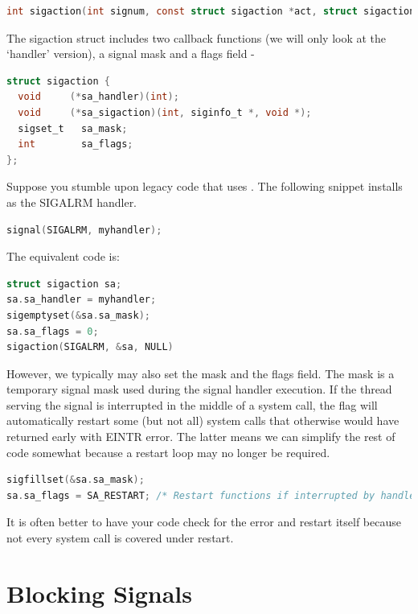 \begin{lstlisting}[language=C]
int sigaction(int signum, const struct sigaction *act, struct sigaction *oldact);
\end{lstlisting}

The sigaction struct includes two callback functions (we will only look at the `handler' version), a signal mask and a flags field -

\begin{lstlisting}[language=C]
struct sigaction {
  void     (*sa_handler)(int);
  void     (*sa_sigaction)(int, siginfo_t *, void *);
  sigset_t   sa_mask;
  int        sa_flags;
};
\end{lstlisting}

Suppose you stumble upon legacy code that uses .
The following snippet installs  as the SIGALRM handler.

\begin{lstlisting}[language=C]
signal(SIGALRM, myhandler);
\end{lstlisting}

The equivalent  code is:

\begin{lstlisting}[language=C]
struct sigaction sa;
sa.sa_handler = myhandler;
sigemptyset(&sa.sa_mask);
sa.sa_flags = 0;
sigaction(SIGALRM, &sa, NULL)
\end{lstlisting}

However, we typically may also set the mask and the flags field.
The mask is a temporary signal mask used during the signal handler execution.
If the thread serving the signal is interrupted in the middle of a system call, the  flag will automatically restart some (but not all) system calls that otherwise would have returned early with EINTR error.
The latter means we can simplify the rest of code somewhat because a restart loop may no longer be required.

\begin{lstlisting}[language=C]
sigfillset(&sa.sa_mask);
sa.sa_flags = SA_RESTART; /* Restart functions if interrupted by handler */
\end{lstlisting}

It is often better to have your code check for the error and restart itself because not every system call is covered under restart.

\section{Blocking Signals}

